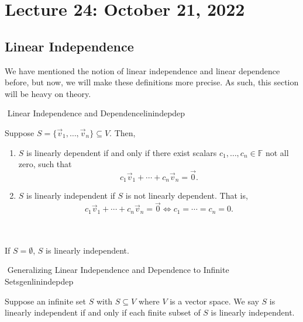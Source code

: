 \pagebreak

\section{Lecture 24: October 21, 2022}

    \subsection{Linear Independence}

        We have mentioned the notion of linear independence and linear dependence before, but now, we will make these definitions more precise. As such, this section will be heavy on theory.
        \begin{definition}{\Stop\,\,Linear Independence and Dependence}{linindepdep}
            
            Suppose \(S=\{\vec{v}_1,\ldots,\vec{v}_n\}\subseteq V\). Then,
            \begin{enumerate}
                \item \(S\) is linearly dependent if and only if there exist scalars \(c_1,\ldots,c_n\in\mathbb{F}\) not all zero, such that
                \begin{equation*}
                    c_1\vec{v}_1+\cdots+c_n\vec{v}_n=\vec{0}.
                \end{equation*}
                \item \(S\) is linearly independent if \(S\) is not linearly dependent. That is,
                \begin{equation*}
                    c_1\vec{v}_1+\cdots+c_n\vec{v}_n=\vec{0} \iff c_1=\cdots=c_n=0.
                \end{equation*}
            \end{enumerate}
            \vphantom
            \\
            \\
            If \(S=\emptyset\), \(S\) is linearly independent.

        \end{definition}
        \begin{definition}{\Stop\,\,Generalizing Linear Independence and Dependence to Infinite Sets}{genlinindepdep}
            
            Suppose an infinite set \(S\) with \(S\subseteq V\) where \(V\) is a vector space. We say \(S\) is linearly independent if and only if each finite subset of \(S\) is linearly independent.

        \end{definition}
